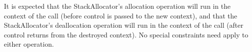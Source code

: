 It is expected that the StackAllocator's allocation operation will run in the
context of the \callcc call (before control is passed to the new context), and
that the StackAllocator's deallocation operation will run in the context of
the  call (after control returns from the destroyed
context). No special constraints need apply to either operation.
